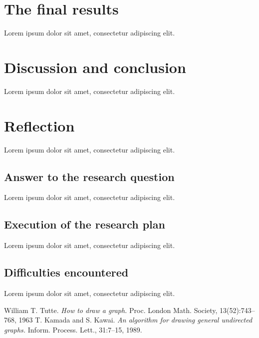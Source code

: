 \documentclass[a4paper,12pt,twoside]{article}
\begin{document}
\section{The final results}
Lorem ipsum dolor sit amet, consectetur adipiscing elit.

\section{Discussion and conclusion}
Lorem ipsum dolor sit amet, consectetur adipiscing elit.

\section{Reflection}
Lorem ipsum dolor sit amet, consectetur adipiscing elit.
\subsection{Answer to the research question}
Lorem ipsum dolor sit amet, consectetur adipiscing elit.
\subsection{Execution of the research plan}
Lorem ipsum dolor sit amet, consectetur adipiscing elit.\subsection{Difficulties encountered}
Lorem ipsum dolor sit amet, consectetur adipiscing elit.

\begin{thebibliography}{99}
William T. Tutte. \emph{How to draw a graph.} Proc. London Math. Society, 13(52):743–768, 1963
T. Kamada and S. Kawai. \emph{An algorithm for drawing general undirected graphs.} Inform. Process. Lett., 31:7–15, 1989.
\end{thebibliography}
\end{document}
